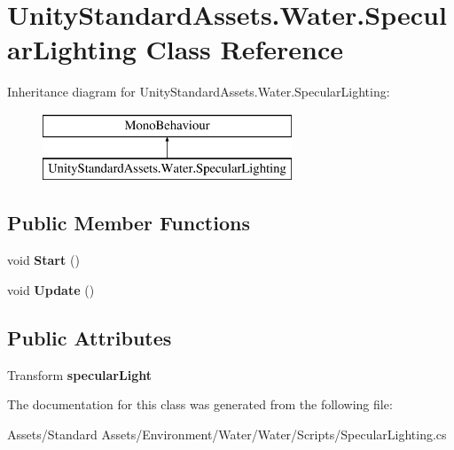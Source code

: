 \hypertarget{class_unity_standard_assets_1_1_water_1_1_specular_lighting}{}\section{Unity\+Standard\+Assets.\+Water.\+Specular\+Lighting Class Reference}
\label{class_unity_standard_assets_1_1_water_1_1_specular_lighting}
Inheritance diagram for Unity\+Standard\+Assets.\+Water.\+Specular\+Lighting\+:\begin{figure}[H]
\begin{center}
\leavevmode
\includegraphics[height=2.000000cm]{class_unity_standard_assets_1_1_water_1_1_specular_lighting}
\end{center}
\end{figure}
\subsection*{Public Member Functions}
\begin{DoxyCompactItemize}
\item 
void {\bfseries Start} ()\hypertarget{class_unity_standard_assets_1_1_water_1_1_specular_lighting_a07ab47d7f4b7e70150aed7dd5b4d5757}{}\label{class_unity_standard_assets_1_1_water_1_1_specular_lighting_a07ab47d7f4b7e70150aed7dd5b4d5757}

\item 
void {\bfseries Update} ()\hypertarget{class_unity_standard_assets_1_1_water_1_1_specular_lighting_a1c0024700a30bd767d5cd78552c96e0b}{}\label{class_unity_standard_assets_1_1_water_1_1_specular_lighting_a1c0024700a30bd767d5cd78552c96e0b}

\end{DoxyCompactItemize}
\subsection*{Public Attributes}
\begin{DoxyCompactItemize}
\item 
Transform {\bfseries specular\+Light}\hypertarget{class_unity_standard_assets_1_1_water_1_1_specular_lighting_a715795cec47659a254638d071c0c9c51}{}\label{class_unity_standard_assets_1_1_water_1_1_specular_lighting_a715795cec47659a254638d071c0c9c51}

\end{DoxyCompactItemize}


The documentation for this class was generated from the following file\+:\begin{DoxyCompactItemize}
\item 
Assets/\+Standard Assets/\+Environment/\+Water/\+Water/\+Scripts/Specular\+Lighting.\+cs\end{DoxyCompactItemize}
